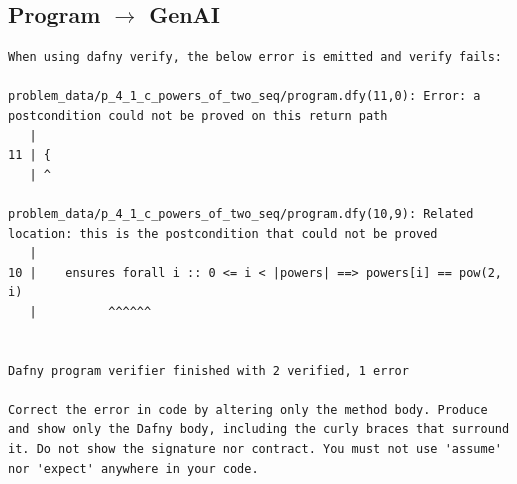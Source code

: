 \documentclass{article}
\begin{document}
\subsection*{Program $\rightarrow$ GenAI}
\begin{lstlisting}
When using dafny verify, the below error is emitted and verify fails:

problem_data/p_4_1_c_powers_of_two_seq/program.dfy(11,0): Error: a postcondition could not be proved on this return path
   |
11 | {
   | ^

problem_data/p_4_1_c_powers_of_two_seq/program.dfy(10,9): Related location: this is the postcondition that could not be proved
   |
10 | 	ensures forall i :: 0 <= i < |powers| ==> powers[i] == pow(2, i)
   |          ^^^^^^


Dafny program verifier finished with 2 verified, 1 error

Correct the error in code by altering only the method body. Produce and show only the Dafny body, including the curly braces that surround it. Do not show the signature nor contract. You must not use 'assume' nor 'expect' anywhere in your code.
\end{lstlisting}
\end{document}
